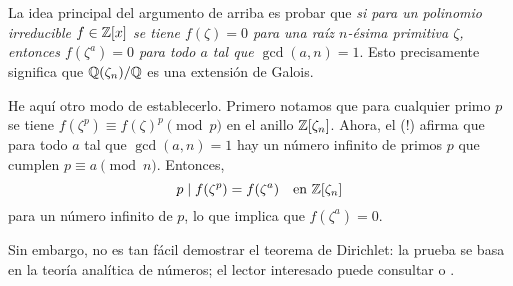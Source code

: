 \begin{comentario}
  La idea principal del argumento de arriba es probar que \emph{si para un
    polinomio irreducible $f \in \mathbb{Z} [x]$ se tiene $f (\zeta) = 0$ para una raíz
    $n$-ésima primitiva $\zeta$, entonces $f (\zeta^a) = 0$ para todo $a$ tal
    que $\gcd (a,n) = 1$}. Esto precisamente significa que $\mathbb{Q} (\zeta_n)/\mathbb{Q}$
  es una extensión de Galois.

  He aquí otro modo de establecerlo. Primero notamos que para cualquier primo
  $p$ se tiene $f (\zeta^p) \equiv f (\zeta)^p \pmod{p}$ en el anillo $\mathbb{Z}
  [\zeta_n]$. Ahora, el  (!) afirma que para todo $a$ tal que $\gcd (a,n) = 1$ hay un
  número infinito de primos $p$ que cumplen $p \equiv a \pmod{n}$. Entonces,
  $$p \mid f (\zeta^p) = f (\zeta^a) \quad \text{en }\mathbb{Z} [\zeta_n]$$
  para un número infinito de $p$, lo que implica que $f (\zeta^a) = 0$.

  Sin embargo, no es tan fácil demostrar el teorema de Dirichlet: la prueba se
  basa en la teoría analítica de números; el lector interesado puede consultar
  \cite[Chapter~16]{Ireland-Rosen} o \cite[Chapter~7]{Apostol-analytic}.
\end{comentario}
